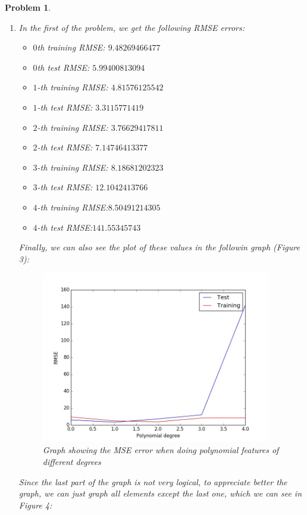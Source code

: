\documentclass[12pt]{article}
\newtheorem{problem}{Problem}%
\begin{document}
\begin{problem}
\normalfont
\begin{enumerate}
\item In the first of the problem, we get the following RMSE errors:
\begin{itemize}
\item $0$th training RMSE: $9.48269466477$
\item $0$th test RMSE: $5.99400813094$
\item $1$-th training RMSE: $4.81576125542$
\item $1$-th test RMSE: $3.3115771419$
\item $2$-th training RMSE: $3.76629417811$
\item $2$-th test RMSE: $7.14746413377$
\item $3$-th training RMSE: $8.18681202323$
\item $3$-th test RMSE: $12.1042413766$
\item $4$-th training RMSE:$8.50491214305$
\item $4$-th test RMSE:$141.55345743$
\end{itemize} 

Finally, we can also see the plot of these values in the followin graph (Figure 3):

\begin{figure}[h]
\centering
\includegraphics[width=10cm]{HWP2_all_RMSE_degree.jpg}
\caption{Graph showing the MSE error when doing polynomial features of different degrees}
\end{figure}

Since the last part of the graph is not very logical, to appreciate better the graph, we can just graph all elements except the last one, which we can see in Figure 4:


\end{enumerate}
\end{problem}
\end{document}
